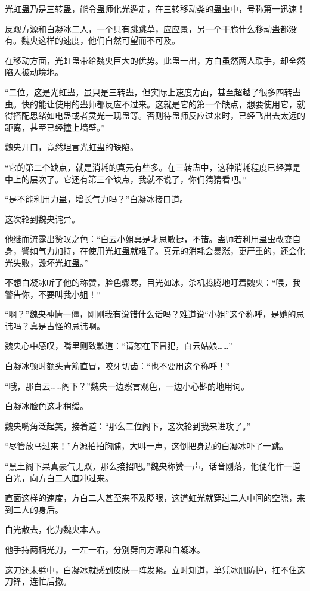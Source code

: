 \begin{this_body}
光虹蛊乃是三转蛊，能令蛊师化光遁走，在三转移动类的蛊虫中，号称第一迅速！

反观方源和白凝冰二人，一个只有跳跳草，应应景，另一个干脆什么移动蛊都没有。魏央这样的速度，他们自然可望而不可及。

在移动方面，光虹蛊带给魏央巨大的优势。此蛊一出，方白虽然两人联手，却全然陷入被动境地。

“二位，这是光虹蛊，虽只是三转蛊，但实际上速度方面，甚至超越了很多四转蛊虫。快的能让使用的蛊师都反应不过来。这就是它的第一个缺点，想要使用它，就得搭配思绪如电蛊或者灵光一现蛊等。否则待蛊师反应过来时，已经飞出去太远的距离，甚至已经撞上墙壁。”

魏央开口，竟然坦言光虹蛊的缺陷。

“它的第二个缺点，就是消耗的真元有些多。在三转蛊中，这种消耗程度已经算是中上的层次了。它还有第三个缺点，我就不说了，你们猜猜看吧。”

“是不能利用力蛊，增长气力吗？”白凝冰接口道。

这次轮到魏央诧异。

他继而流露出赞叹之色：“白云小姐真是才思敏捷，不错。蛊师若利用蛊虫改变自身，譬如气力加持，在使用光虹蛊就难了。真元的消耗会暴涨，更严重的，还会化光失败，毁坏光虹蛊。”

不想白凝冰听了他的称赞，脸色骤寒，目光如冰，杀机腾腾地盯着魏央：“喂，我警告你，不要叫我小姐！”

“啊？”魏央神情一僵，刚刚我有说错什么话吗？难道说“小姐”这个称呼，是她的忌讳吗？真是古怪的忌讳啊。

魏央心中感叹，嘴里则致歉道：“请恕在下冒犯，白云姑娘……”

白凝冰顿时额头青筋直冒，咬牙切齿：“也不要用这个称呼！”

“哦，那白云……阁下？”魏央一边察言观色，一边小心斟酌地用词。

白凝冰脸色这才稍缓。

魏央嘴角泛起笑，接着道：“那么二位阁下，这次轮到我来进攻了。”

“尽管放马过来！”方源拍拍胸脯，大叫一声，这倒把身边的白凝冰吓了一跳。

“黑土阁下果真豪气无双，那么接招吧。”魏央称赞一声，话音刚落，他便化作一道白光，向方白二人直冲过来。

直面这样的速度，方白二人甚至来不及眨眼，这道虹光就穿过二人中间的空隙，来到二人的身后。

白光散去，化为魏央本人。

他手持两柄光刀，一左一右，分别劈向方源和白凝冰。

这刀还未劈中，白凝冰就感到皮肤一阵发紧。立时知道，单凭冰肌防护，扛不住这刀锋，连忙后撤。


\end{this_body}
